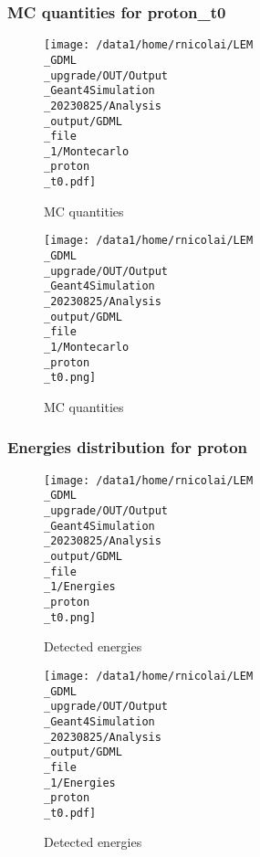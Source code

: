 \documentclass[8pt]{beamer}
\begin{document}
            \begin{frame}
                \frametitle{MC quantities for proton\_t0}
            
        \begin{figure}[h]
            \centering
            \texttt{[image: /data1/home/rnicolai/LEM\\\_GDML\\\_upgrade/OUT/Output\\\_Geant4Simulation\\\_20230825/Analysis\\\_output/GDML\\\_file\\\_1/Montecarlo\\\_proton\\\_t0.pdf]}
            \caption{MC quantities}
        \end{figure}
        
        \begin{figure}[h]
            \centering
            \texttt{[image: /data1/home/rnicolai/LEM\\\_GDML\\\_upgrade/OUT/Output\\\_Geant4Simulation\\\_20230825/Analysis\\\_output/GDML\\\_file\\\_1/Montecarlo\\\_proton\\\_t0.png]}
            \caption{MC quantities}
        \end{figure}
        
            \end{frame}
            
            \begin{frame}
                \frametitle{Energies distribution for proton}
            
        \begin{figure}[h]
            \centering
            \texttt{[image: /data1/home/rnicolai/LEM\\\_GDML\\\_upgrade/OUT/Output\\\_Geant4Simulation\\\_20230825/Analysis\\\_output/GDML\\\_file\\\_1/Energies\\\_proton\\\_t0.png]}
            \caption{Detected energies}
        \end{figure}
        
        \begin{figure}[h]
            \centering
            \texttt{[image: /data1/home/rnicolai/LEM\\\_GDML\\\_upgrade/OUT/Output\\\_Geant4Simulation\\\_20230825/Analysis\\\_output/GDML\\\_file\\\_1/Energies\\\_proton\\\_t0.pdf]}
            \caption{Detected energies}
        \end{figure}
        
            \end{frame}
            
\end{document}
